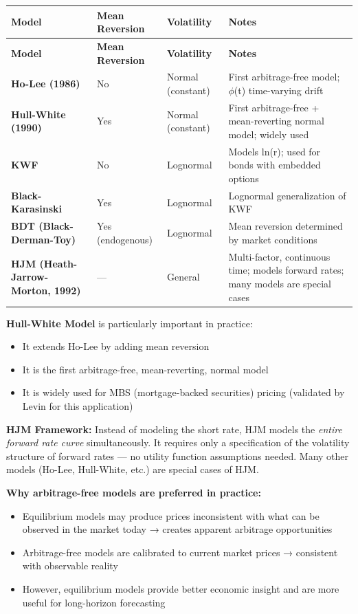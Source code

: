 \documentclass[12pt,openany]{book}
\theoremstyle{definition}
\theoremstyle{remark}
\begin{document}
\begingroup
\footnotesize
\begin{longtable}{@{}L{0.15\textwidth}L{0.25\textwidth}L{0.25\textwidth}L{0.25\textwidth}@{}}
\toprule
\textbf{Model} & \textbf{Mean Reversion} & \textbf{Volatility} & \textbf{Notes} \\
\midrule
\endfirsthead
\toprule
\textbf{Model} & \textbf{Mean Reversion} & \textbf{Volatility} & \textbf{Notes} \\
\midrule
\endhead
\textbf{Ho-Lee (1986)} & No & Normal (constant) & First arbitrage-free model; \(\phi\)(t) time-varying drift \\
\textbf{Hull-White (1990)} & Yes & Normal (constant) & First arbitrage-free + mean-reverting normal model; widely used \\
\textbf{KWF} & No & Lognormal & Models ln(r); used for bonds with embedded options \\
\textbf{Black-Karasinski} & Yes & Lognormal & Lognormal generalization of KWF \\
\textbf{BDT (Black-Derman-Toy)} & Yes (endogenous) & Lognormal & Mean reversion determined by market conditions \\
\textbf{HJM (Heath-Jarrow-Morton, 1992)} & --- & General & Multi-factor, continuous time; models forward rates; many models are special cases \\
\bottomrule
\end{longtable}
\endgroup
\textbf{Hull-White Model} is particularly important in practice:

\begin{itemize}
\item It extends Ho-Lee by adding mean reversion


\item It is the first arbitrage-free, mean-reverting, normal model


\item It is widely used for MBS (mortgage-backed securities) pricing (validated by Levin for this application)


\end{itemize}
\textbf{HJM Framework:} Instead of modeling the short rate, HJM models the \emph{entire forward rate curve} simultaneously. It requires only a specification of the volatility structure of forward rates --- no utility function assumptions needed. Many other models (Ho-Lee, Hull-White, etc.) are special cases of HJM.

\textbf{Why arbitrage-free models are preferred in practice:}

\begin{itemize}
\item Equilibrium models may produce prices inconsistent with what can be observed in the market today → creates apparent arbitrage opportunities


\item Arbitrage-free models are calibrated to current market prices → consistent with observable reality


\item However, equilibrium models provide better economic insight and are more useful for long-horizon forecasting


\end{itemize}
\medskip
\end{document}
